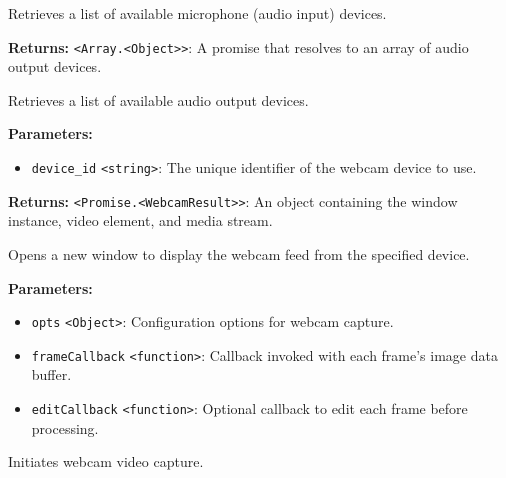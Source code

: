 \documentclass[12pt,a4paper]{article}
\begin{document}
\noindent Retrieves a list of available microphone (audio input) devices.

\vspace{5mm}
\noindent {}


\noindent \textbf{Returns:} \texttt{<Array.<Object>>}: A promise that resolves to an array of audio output devices.

\noindent Retrieves a list of available audio output devices.

\vspace{5mm}
\noindent {}


\noindent \textbf{Parameters:}
\begin{itemize}
  \item \texttt{device\_id} \texttt{<string>}: The unique identifier of the webcam device to use.
\end{itemize}

\noindent \textbf{Returns:} \texttt{<Promise.<WebcamResult>>}: An object containing the window instance, video element, and media stream.

\noindent Opens a new window to display the webcam feed from the specified device.

\vspace{5mm}
\noindent {}


\noindent \textbf{Parameters:}
\begin{itemize}
  \item \texttt{opts} \texttt{<Object>}: Configuration options for webcam capture.
  \item \texttt{frameCallback} \texttt{<function>}: Callback invoked with each frame's image data buffer.
  \item \texttt{editCallback} \texttt{<function>}: Optional callback to edit each frame before processing.
\end{itemize}

\noindent Initiates webcam video capture.

\vspace{5mm}
\noindent {}
\end{document}
